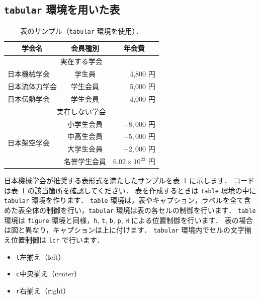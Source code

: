 \subsection{\texttt{tabular} 環境を用いた表}
\label{ssec:tabular}

\begin{table}[tp]
    \centering
    \caption{表のサンプル（\texttt{tabular} 環境を使用）．}
    \label{table:tabular}
    \begin{tabular}{l|c|r} \hline\hline
        \multicolumn{1}{c|}{学会名}  & 会員種別  & \multicolumn{1}{c}{年会費} \\ \hline
        \multicolumn{3}{c}{実在する学会} \\ \hline
        日本機械学会    & 学生員    & 4,800 円 \\ \hline
        日本流体力学会  & 学生会員  & 5,000 円 \\ \hline
        日本伝熱学会    & 学生会員  & 4,000 円 \\ \hline
        \multicolumn{3}{c}{実在しない学会} \\ \hline
        \multirow{4}{*}{日本架空学会}& 小学生会員  & $-8,000$ 円 \\ \cline{2-3}
        & 中高生会員  & $-5,000$ 円 \\ \cline{2-3}
        & 大学生会員  & $-2,000$ 円 \\ \cline{2-3}
        & 名誉学生会員  & $6.02 \times 10^{23}$ 円 \\ \hline
    \end{tabular}
\end{table}

日本機械学会が推奨する表形式を満たしたサンプルを表~\ref{table:tabular} に示します．
コードは表~\ref{table:tabular} の該当箇所を確認してください．
表を作成するときは \verb|table| 環境の中に \verb|tabular| 環境を作ります．
\verb|table| 環境は，表やキャプション，ラベルを全て含めた表全体の制御を行い，\verb|tabular| 環境は表の各セルの制御を行います．
\verb|table| 環境は \verb|figure| 環境と同様，\verb|h|, \verb|t|, \verb|b|, \verb|p|, \verb|H| による位置制御を行います．
表の場合は図と異なり，キャプションは上に付けます．
\verb|tabular| 環境内でセルの文字揃え位置制御は \verb|lcr| で行います．

\begin{itemize}
    \item \verb|l|\quad 左揃え（\textbf{l}eft）
    \item \verb|c|\quad 中央揃え（\textbf{c}enter）
    \item \verb|r|\quad 右揃え（\textbf{r}ight）
\end{itemize}

